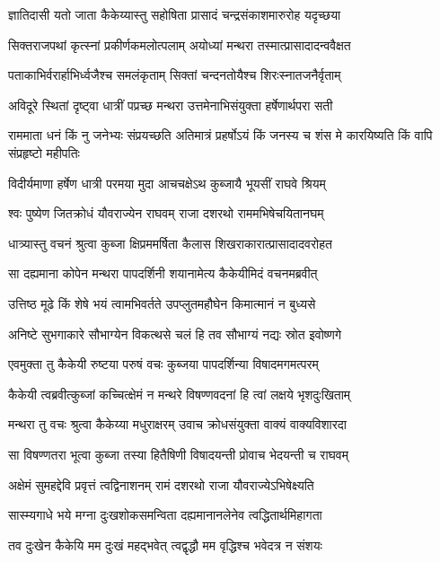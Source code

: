 \twolineshloka
{ज्ञातिदासी यतो जाता कैकेय्यास्तु सहोषिता}
{प्रासादं चन्द्रसंकाशमारुरोह यदृच्छया} %

\twolineshloka
{सिक्तराजपथां कृत्स्नां प्रकीर्णकमलोत्पलाम्}
{अयोध्यां मन्थरा तस्मात्प्रासादादन्ववैक्षत} %

\twolineshloka
{पताकाभिर्वरार्हाभिर्ध्वजैश्च समलंकृताम्}
{सिक्तां चन्दनतोयैश्च शिरःस्नातजनैर्वृताम्} %

\twolineshloka
{अविदूरे स्थितां दृष्ट्वा धात्रीं पप्रच्छ मन्थरा}
{उत्तमेनाभिसंयुक्ता हर्षेणार्थपरा सती} %

\threelineshloka
{राममाता धनं किं नु जनेभ्यः संप्रयच्छति}
{अतिमात्रं प्रहर्षोऽयं किं जनस्य च शंस मे}
{कारयिष्यति किं वापि संप्रहृष्टो महीपतिः} %

\twolineshloka
{विदीर्यमाणा हर्षेण धात्री परमया मुदा}
{आचचक्षेऽथ कुब्जायै भूयसीं राघवे श्रियम्} %

\twolineshloka
{श्वः पुष्येण जितक्रोधं यौवराज्येन राघवम्}
{राजा दशरथो राममभिषेचयितानघम्} %

\twolineshloka
{धात्र्यास्तु वचनं श्रुत्वा कुब्जा क्षिप्रममर्षिता}
{कैलास शिखराकारात्प्रासादादवरोहत} %

\twolineshloka
{सा दह्यमाना कोपेन मन्थरा पापदर्शिनी}
{शयानामेत्य कैकेयीमिदं वचनमब्रवीत्} %

\twolineshloka
{उत्तिष्ठ मूढे किं शेषे भयं त्वामभिवर्तते}
{उपप्लुतमहौघेन किमात्मानं न बुध्यसे} %

\twolineshloka
{अनिष्टे सुभगाकारे सौभाग्येन विकत्थसे}
{चलं हि तव सौभाग्यं नद्यः स्रोत इवोष्णगे} %

\twolineshloka
{एवमुक्ता तु कैकेयी रुष्टया परुषं वचः}
{कुब्जया पापदर्शिन्या विषादमगमत्परम्} %

\twolineshloka
{कैकेयी त्वब्रवीत्कुब्जां कच्चित्क्षेमं न मन्थरे}
{विषण्णवदनां हि त्वां लक्षये भृशदुःखिताम्} %

\twolineshloka
{मन्थरा तु वचः श्रुत्वा कैकेय्या मधुराक्षरम्}
{उवाच क्रोधसंयुक्ता वाक्यं वाक्यविशारदा} %

\twolineshloka
{सा विषण्णतरा भूत्वा कुब्जा तस्या हितैषिणी}
{विषादयन्ती प्रोवाच भेदयन्ती च राघवम्} %

\twolineshloka
{अक्षेमं सुमहद्देवि प्रवृत्तं त्वद्विनाशनम्}
{रामं दशरथो राजा यौवराज्येऽभिषेक्ष्यति} %

\twolineshloka
{सास्म्यगाधे भये मग्ना दुःखशोकसमन्विता}
{दह्यमानानलेनेव त्वद्धितार्थमिहागता} %

\twolineshloka
{तव दुःखेन कैकेयि मम दुःखं महद्भवेत्}
{त्वद्वृद्धौ मम वृद्धिश्च भवेदत्र न संशयः} %

